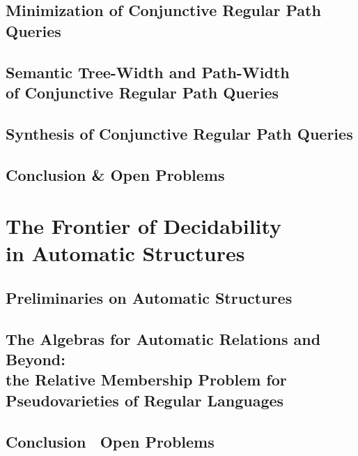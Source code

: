 \documentclass[a4paper,sfsidenotes,twoside,justified,nobib]{tufte-book-custom}
\begin{document}
\chapter{Minimization of Conjunctive Regular Path Queries}

\chapter[{Semantic Tree-Width and Path-Width of Conjunctive Regular Path Queries}]{Semantic Tree-Width and Path-Width\\of Conjunctive Regular Path Queries}

\chapter{Synthesis of Conjunctive Regular Path Queries}

\chapter{Conclusion \& Open Problems}

\part[The Frontier of Decidability in Automatic Structures]{The Frontier of Decidability\\in Automatic Structures}

\chapter{Preliminaries on Automatic Structures}



\chapter{The Algebras for Automatic Relations and Beyond:\\the Relative Membership Problem for Pseudovarieties of Regular Languages}

\chapter{Conclusion \fancyand~Open Problems}


\backmatter
\printbibliography
\end{document}
